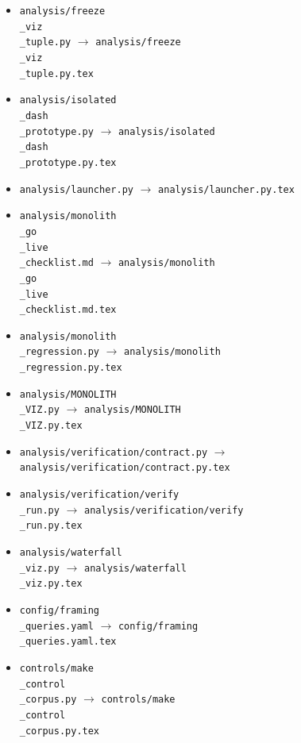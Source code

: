 \documentclass[11pt]{article}
\begin{document}
\begin{itemize}
\item \texttt{analysis/freeze\\_viz\\_tuple.py} $\rightarrow$ \texttt{analysis/freeze\\_viz\\_tuple.py.tex}
\item \texttt{analysis/isolated\\_dash\\_prototype.py} $\rightarrow$ \texttt{analysis/isolated\\_dash\\_prototype.py.tex}
\item \texttt{analysis/launcher.py} $\rightarrow$ \texttt{analysis/launcher.py.tex}
\item \texttt{analysis/monolith\\_go\\_live\\_checklist.md} $\rightarrow$ \texttt{analysis/monolith\\_go\\_live\\_checklist.md.tex}
\item \texttt{analysis/monolith\\_regression.py} $\rightarrow$ \texttt{analysis/monolith\\_regression.py.tex}
\item \texttt{analysis/MONOLITH\\_VIZ.py} $\rightarrow$ \texttt{analysis/MONOLITH\\_VIZ.py.tex}
\item \texttt{analysis/verification/contract.py} $\rightarrow$ \texttt{analysis/verification/contract.py.tex}
\item \texttt{analysis/verification/verify\\_run.py} $\rightarrow$ \texttt{analysis/verification/verify\\_run.py.tex}
\item \texttt{analysis/waterfall\\_viz.py} $\rightarrow$ \texttt{analysis/waterfall\\_viz.py.tex}
\item \texttt{config/framing\\_queries.yaml} $\rightarrow$ \texttt{config/framing\\_queries.yaml.tex}
\item \texttt{controls/make\\_control\\_corpus.py} $\rightarrow$ \texttt{controls/make\\_control\\_corpus.py.tex}

\end{itemize}
\end{document}
